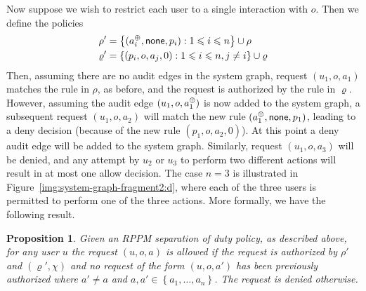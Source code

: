 \documentclass{article}
\newtheorem{proposition}{Proposition}
\newcommand{\set}[1]{\ensuremath{\left\{#1\right\}}} \newcommand{\setO}[1]{\ensuremath{\left\{#1\right.}} \newcommand{\setC}[1]{\ensuremath{\left.#1\right\}}} \newcommand{\setN}[1]{\ensuremath{\left.#1\right.}} \newcommand{\sett}[1]{\ensuremath{\left\{\textit{#1}\right\}}} \newcommand{\tuple}[1]{\ensuremath{\left(#1\right)}} \newcommand{\tuplet}[1]{\ensuremath{\left(\textit{#1}\right)}} \newcommand{\card}[1]{\left| #1 \right|}
\begin{document}
Now suppose we wish to restrict each user to a single interaction with $o$.
Then we define the policies
\begin{align*}
 \rho' &= \set{(\audita{a_i},\none,p_i) : 1 \leqslant i \leqslant n} \cup \rho \\
 \varrho' &= \set{(p_i,o,a_j,0) : 1 \leqslant i \leqslant n, j \ne i} \cup \varrho \\
\end{align*}
Then, assuming there are no audit edges in the system graph, request $(u_1,o,a_1)$ matches the rule in $\rho$, as before, and the request is authorized by the rule in $\varrho$.
However, assuming the audit edge $(u_1,o,a_1^\oplus)$ is now added to the system graph, a subsequent request $(u_1,o,a_2)$ will match the new rule $(a_1^\oplus,\mathsf{none},p_1)$, leading to a deny decision (because of the new rule $(p_1,o,a_2,0)$).
At this point a deny audit edge will be added to the system graph.
Similarly, request $(u_1,o,a_3)$ will be denied, and any attempt by $u_2$ or $u_3$ to perform two different actions will result in at most one allow decision.
The case $n=3$ is illustrated in Figure~\ref{img:system-graph-fragment2:d}, where each of the three users is permitted to perform one of the three actions.
More formally, we have the following result.

\begin{proposition}\label{prop:separation-of-duty}
    Given an RPPM separation of duty policy, as described above, for any user $u$ the request $(u,o,a)$ is allowed if the request is authorized by $\rho'$ and $(\varrho',\chi)$ and no request of the form $(u,o,a')$ has been previously authorized where $a' \neq a$ and $a, a' \in \set{a_1,\dots,a_n}$. The request is denied otherwise.
\end{proposition}
\end{document}
